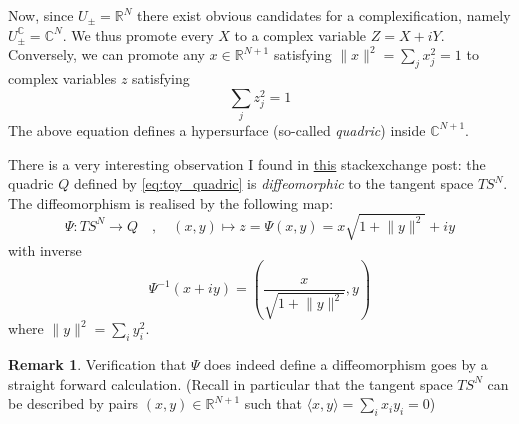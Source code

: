 \documentclass[a4paper,11pt]{article}
\theoremstyle{definition}
\newtheorem{remark}{Remark}
\newcommand{\RR}{\mathbb{R}}
\newcommand{\CC}{\mathbb{C}}
\begin{document}
Now, since $U_{\pm} = \RR^N$ there exist obvious candidates for a complexification, namely $U^{\CC}_{\pm} = \CC^N$. 
We thus promote every $X$ to a complex variable $Z = X + i Y$.
Conversely, we can promote any $x \in \RR^{N+1}$ satisfying $\lVert x \rVert^2 = \sum_j x_j^2 = 1$ to complex variables $z$ satisfying 
\begin{equation}
  \sum_j z_j^2 = 1
  \label{eq:toy_quadric}
\end{equation}
The above equation defines a hypersurface (so-called \emph{quadric}) inside $\CC^{N+1}$.

There is a very interesting observation I found in \href{https://math.stackexchange.com/questions/1784898/tangent-bundle-of-sphere-as-a-complex-manifold}{this} stackexchange post: the quadric $Q$ defined by \eqref{eq:toy_quadric} is \emph{diffeomorphic} to the tangent space $TS^N$.
The diffeomorphism is realised by the following map:
\begin{equation}
  \Psi \colon TS^{N} \to Q \quad , \quad (x,y) \mapsto z = \Psi(x,y) = x \sqrt{1 + \lVert y \rVert^2} + i y
\end{equation}
with inverse 
\begin{equation}
  \Psi^{-1}(x + i y) = \left( \frac{x}{\sqrt{1 + \lVert y \rVert^2}}, y \right) 
\end{equation}
where $\lVert y \rVert^2 = \sum_{i} y_i^2$.
\begin{remark}
Verification that $\Psi$ does indeed define a diffeomorphism goes by a straight forward calculation.
(Recall in particular that the tangent space $TS^N$ can be described by pairs $(x,y) \in \RR^{N+1}$ such that $\langle x, y\rangle = \sum_i x_i y_i = 0$)
\end{remark}
\end{document}
